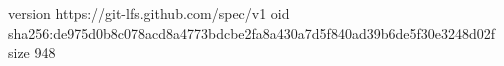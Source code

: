 version https://git-lfs.github.com/spec/v1
oid sha256:de975d0b8c078acd8a4773bdcbe2fa8a430a7d5f840ad39b6de5f30e3248d02f
size 948
